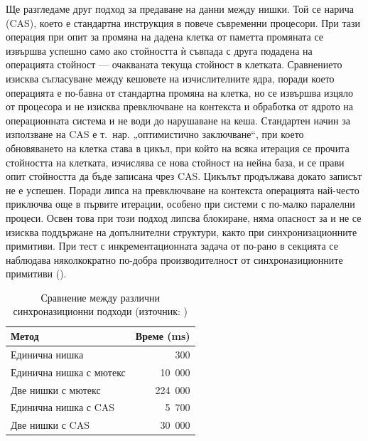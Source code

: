 Ще разгледаме друг подход за предаване на данни между нишки. Той се нарича  (CAS), което е стандартна инструкция в повече съвременни процесори. При тази операция при опит за промяна на дадена клетка от паметта промяната се извършва успешно само ако стойността ѝ съвпада с друга подадена на операцията стойност — очакваната текуща стойност в клетката. Сравнението изисква съгласуване между кешовете на изчислителните ядра, поради което операцията е по-бавна от стандартна промяна на клетка, но се извършва изцяло от процесора и не изисква превключване на контекста и обработка от ядрото на операционната система и не води до нарушаване на кеша. Стандартен начин за използване на CAS е т.~нар. „оптимистично заключване“, при което обновяването на клетка става в цикъл, при който на всяка итерация се прочита стойността на клетката, изчислява се нова стойност на нейна база, и се прави опит стойността да бъде записана чрез CAS. Цикълът продължава докато записът не е успешен. Поради липса на превключване на контекста операцията най-често приключва още в първите итерации, особено при системи с по-малко паралелни процеси. Освен това при този подход липсва блокиране, няма опасност за  и не се изисква поддържане на допълнителни структури, както при синхронизационните примитиви. При тест с инкрементационната задача от по-рано в секцията се наблюдава няколкократно по-добра производителност от синхроназиционните примитиви \cite{thompson2011Disruptor} ().

\begin{table}
  \centering
  \begin{tabular}{|l|r|}
    \hline
    {\bf Метод}             & {\bf Време (ms)} \\ \hline
    Единична нишка          & 300              \\ \hline
    Единична нишка с мютекс & 10~000            \\ \hline
    Две нишки с мютекс      & 224~000           \\ \hline
    Единична нишка с CAS    & 5~700             \\ \hline
    Две нишки с CAS         & 30~000            \\ \hline
  \end{tabular}
  \caption[Сравнение между различни синхроназиционни подходи]{Сравнение между различни синхроназиционни подходи (източник: \cite{thompson2011Disruptor})}
  \label{tab:synchronazation-performance}
\end{table}

